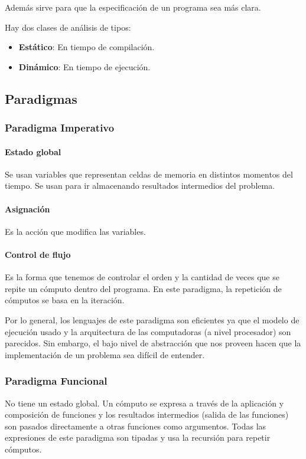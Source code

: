 Además sirve para que la especificación de un programa sea más clara.

Hay dos clases de análisis de tipos:
\begin{itemize}
	\item \textbf{Estático}: En tiempo de compilación.
	\item \textbf{Dinámico}: En tiempo de ejecución.
\end{itemize}

\subsection{Paradigmas}
\subsubsection{Paradigma Imperativo}

\paragraph{Estado global} Se usan variables que representan celdas de memoria en distintos momentos del tiempo. Se usan para ir almacenando resultados intermedios del problema.

\paragraph{Asignación} Es la acción que modifica las variables.

\paragraph{Control de flujo} Es la forma que tenemos de controlar el orden y la cantidad de veces que se repite un cómputo dentro del programa. En este paradigma, la repetición de cómputos se basa en la iteración.

\vspace*{5mm}

Por lo general, los lenguajes de este paradigma son eficientes ya que el modelo de ejecución usado y la arquitectura de las computadoras (a nivel procesador) son parecidos. Sin embargo, el bajo nivel de abstracción que nos proveen hacen que la implementación de un problema sea difícil de entender.

\subsubsection{Paradigma Funcional}
No tiene un estado global. Un cómputo se expresa a través de la aplicación y composición de funciones y los resultados intermedios (salida de las funciones) son pasados directamente a otras funciones como argumentos. Todas las expresiones de este paradigma son tipadas y usa la recursión para repetir cómputos.

